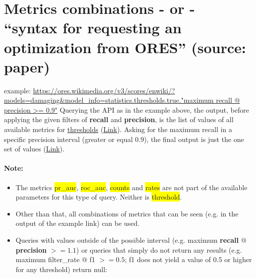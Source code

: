 \documentclass[12pt,a4paper]{article}
\begin{document}
\section{Metrics combinations - or - ``syntax for requesting an optimization from ORES'' (source: paper)}
example: \url{https://ores.wikimedia.org/v3/scores/enwiki/?models=damaging&model_info=statistics.thresholds.true."maximum recall @ precision >= 0.9"}
Querying the API as in the example above, the output, before applying the given filters of \textbf{recall} and \textbf{precision}, is the list of values of all available metrics for \underline{thresholds} (\href{https://ores.wikimedia.org/v3/scores/enwiki/?models=damaging&model_info=statistics.thresholds.true}{Link}).
Asking for the maximum recall in a specific precision interval (greater or equal 0.9), the final output is just the one set of values (\href{https://ores.wikimedia.org/v3/scores/enwiki/?models=damaging&model_info=statistics.thresholds.true.%27maximum%20recall%20@%20precision%20%3E=%200.9%27}{Link}).
\paragraph{Note: }
\begin{itemize}
\item The metrics \colorbox{yellow}{pr\_auc}, \colorbox{yellow}{roc\_auc}, \colorbox{yellow}{counts} and \colorbox{yellow}{rates} are not part of the available parameters for this type of query. Neither is \colorbox{yellow}{threshold}. %
\item Other than that, all combinations of metrics that can be seen (e.g. in the output of the example link) can be used.
\item Queries with values outside of the possible interval (e.g. maximum \textbf{recall} @ \textbf{precision} $>= 1.1$) or queries that simply do not return any results (e.g. maximum filter\_rate @ f1 $>= 0.5$; f1 does not yield a value of 0.5 or higher for any threshold) return null:
\end{itemize}
\end{document}
